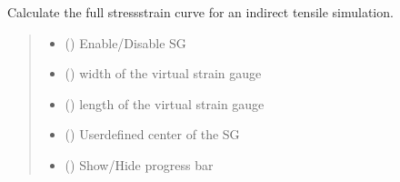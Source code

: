 \documentclass[letterpaper,10pt,english]{sphinxmanual}
\begin{document}
\begin{fulllineitems}
\begin{fulllineitems}
\label{\detokenize{pyfdempp:pyfdempp.pyfdempp.Model.complete_BD_stress_strain}}
\pysigstartsignatures
{}
\pysigstopsignatures
\sphinxAtStartPar
Calculate the full stress\sphinxhyphen{}strain curve for an indirect tensile simulation.
\begin{quote}\begin{description}
\begin{itemize}
\item {} 
\sphinxAtStartPar
{} () \textendash{} Enable/Disable SG

\item {} 
\sphinxAtStartPar
{} () \textendash{} width of the virtual strain gauge

\item {} 
\sphinxAtStartPar
{} () \textendash{} length of the virtual strain gauge

\item {} 
\sphinxAtStartPar
{} (\sphinxstyleliteralemphasis{\sphinxupquote{{[}}}\sphinxstyleliteralemphasis{\sphinxupquote{, }}\sphinxstyleliteralemphasis{\sphinxupquote{, }}\sphinxstyleliteralemphasis{\sphinxupquote{{]}}}) \textendash{} User\sphinxhyphen{}defined center of the SG

\item {} 
\sphinxAtStartPar
{} () \textendash{} Show/Hide progress bar


\end{itemize}
\end{description}
\end{quote}
\end{fulllineitems}
\end{fulllineitems}
\end{document}
